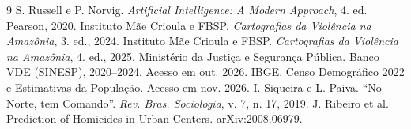 \documentclass[10pt,a4paper,twocolumn]{article}
\begin{document}
\begin{thebibliography}{9}
 S. Russell e P. Norvig. \emph{Artificial Intelligence: A Modern Approach}, 4. ed. Pearson, 2020.
 Instituto Mãe Crioula e FBSP. \emph{Cartografias da Violência na Amazônia}, 3. ed., 2024.
 Instituto Mãe Crioula e FBSP. \emph{Cartografias da Violência na Amazônia}, 4. ed., 2025.
 Ministério da Justiça e Segurança Pública. Banco VDE (SINESP), 2020--2024. Acesso em out. 2026.
 IBGE. Censo Demográfico 2022 e Estimativas da População. Acesso em nov. 2026.
 I. Siqueira e L. Paiva. ``No Norte, tem Comando''. \emph{Rev. Bras. Sociologia}, v. 7, n. 17, 2019.
 J. Ribeiro et al. Prediction of Homicides in Urban Centers. arXiv:2008.06979.
\end{thebibliography}
\end{document}
